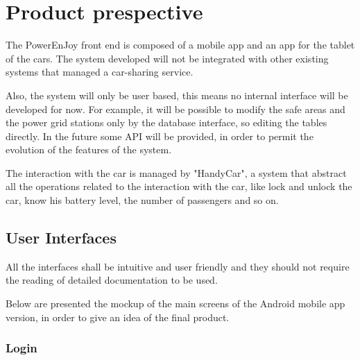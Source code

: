 \section{Product prespective}

The PowerEnJoy front end is composed of a mobile app and an app for the tablet of the cars.
The system developed will not be integrated with other existing systems that managed a car-sharing service.

Also, the system will only be user based, this means no internal interface will be developed for now.
For example, it will be possible to modify the safe areas and the power grid stations only by the database interface, so editing the tables directly.
In the future some API will be provided, in order to permit the evolution of the features of the system.

The interaction with the car is managed by "HandyCar", a system that abstract all the operations related to the interaction with the car, like lock and unlock the car, know his battery level, the number of passengers and so on.

\subsection{User Interfaces}
All the interfaces shall be intuitive and user friendly and they should not
require the reading of detailed documentation to be used.

Below are presented the mockup of the main screens of the Android mobile app version, in order to give an idea of the final product.

\subsubsection*{Login}

